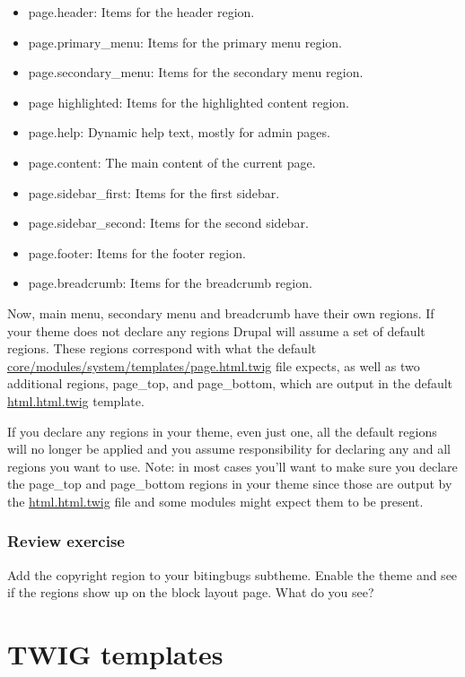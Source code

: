 \begin{itemize}
	\item page.header: Items for the header region.
	\item page.primary\_menu: Items for the primary menu region.
	\item page.secondary\_menu: Items for the secondary menu region.
	\item page highlighted: Items for the highlighted content region.
	\item page.help: Dynamic help text, mostly for admin pages.
	\item page.content: The main content of the current page.
	\item page.sidebar\_first: Items for the first sidebar.
	\item page.sidebar\_second: Items for the second sidebar.
	\item page.footer: Items for the footer region.
	\item page.breadcrumb: Items for the breadcrumb region.
\end{itemize}

Now, main menu, secondary menu and breadcrumb have their own regions. If your theme does not declare any regions Drupal will assume a set of default regions. These regions correspond with what the default \url{core/modules/system/templates/page.html.twig} file expects, as well as two additional regions, page\_top, and page\_bottom, which are output in the default \url{html.html.twig} template.

If you declare any regions in your theme, even just one, all the default regions will no longer be applied and you assume responsibility for declaring any and all regions you want to use. Note: in most cases you'll want to make sure you declare the page\_top and page\_bottom regions in your theme since those are output by the \url{html.html.twig} file and some modules might expect them to be present.

\subsubsection{Review exercise}

Add the copyright region to your bitingbugs subtheme. Enable the theme and see if the regions show up on the block layout page. What do you see?


\section{TWIG templates}


